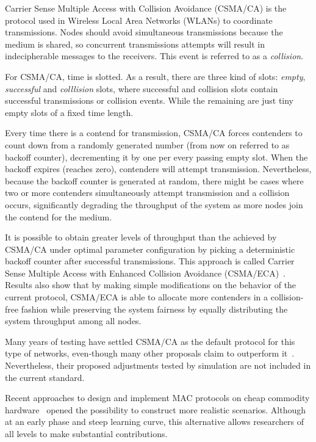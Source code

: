 Carrier Sense Multiple Access with Collision Avoidance (CSMA/CA) is the protocol used in Wireless Local Area Networks (WLANs) to coordinate transmissions. Nodes should avoid simultaneous transmissions because the medium is shared, so concurrent transmissions attempts will result in indecipherable messages to the receivers. This event is referred to as a \emph{collision}. 

For CSMA/CA, time is slotted. As a result, there are three kind of slots: \emph{empty}, \emph{successful} and \emph{colllision} slots, where successful and collision slots contain successful transmissions or collision events. While the remaining are just tiny empty slots of a fixed time length.

Every time there is a contend for transmission, CSMA/CA forces contenders to count down from a randomly generated number (from now on referred to as backoff counter), decrementing it by one per every passing empty slot. When the backoff expires (reaches zero), contenders will attempt transmission. Nevertheless, because the backoff counter is generated at random, there might be cases where two or more contenders simultaneously attempt transmission and a collision occurs, significantly degrading the throughput of the system as more nodes join the contend for the medium.

It is possible to obtain greater levels of throughput than the achieved by CSMA/CA under optimal parameter configuration by picking a deterministic backoff counter after successful transmissions. This approach is called Carrier Sense Multiple Access with Enhanced Collision Avoidance (CSMA/ECA)~\cite{CSMA_ECA}. Results also show that by making simple modifications on the behavior of the current protocol, CSMA/ECA is able to allocate more contenders in a collision-free fashion while preserving the system fairness by equally distributing the system throughput among all nodes. 
% 

Many years of testing have settled CSMA/CA as the default protocol for this type of networks, even-though many other proposals claim to outperform it~\cite{CSMA_ECA,bellalta2009vtc,L_MAC2,HE}. Nevertheless, their proposed adjustments tested by simulation are not included in the current standard.

Recent approaches to design and implement MAC protocols on cheap commodity hardware~\cite{WMP,FLAVIA} opened the possibility to construct more realistic scenarios. Although at an early phase and steep learning curve, this alternative allows researchers of all levels to make substantial contributions.

